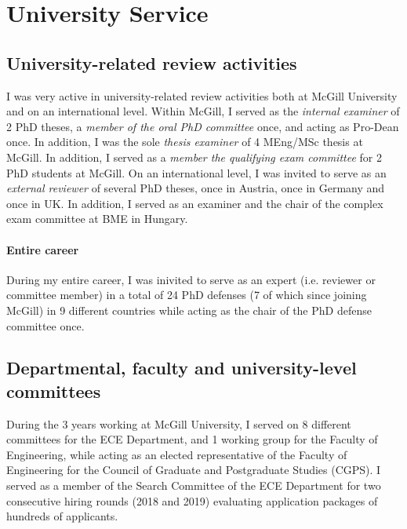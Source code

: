 \section{University Service}
\label{sec:university-service}

\subsection{University-related review activities}
I was very active in university-related review activities both at McGill University and on an international level. Within McGill, I served as the \emph{internal examiner} of 2 PhD theses, a \emph{member of the oral PhD committee} once, and acting as Pro-Dean once. In addition, I was the sole \emph{thesis examiner} of 4 MEng/MSc thesis at McGill. In addition, I served as a \emph{member the qualifying exam committee} for 2 PhD students at McGill. 
On an international level, I was invited to serve as an \emph{external reviewer} of several PhD theses, once in Austria, once in Germany and once in UK. In addition, I served as an examiner and the chair of the complex exam committee at BME in Hungary. 

\paragraph{Entire career}
During my entire career, I was inivited to serve as an expert (i.e. reviewer or committee member) in a total of 24 PhD defenses (7 of which since joining McGill) in 9 different countries while acting as the chair of the PhD defense committee once. 

\subsection{Departmental, faculty and university-level committees}
During the 3 years working at McGill University, I served on 8 different committees for the ECE Department, and 1 working group for the Faculty of Engineering, while acting as an elected representative of the Faculty of Engineering for the Council of Graduate and Postgraduate Studies (CGPS). I served as a member of the Search Committee of the ECE Department for two consecutive hiring rounds (2018 and 2019) evaluating application packages of hundreds of applicants. 

